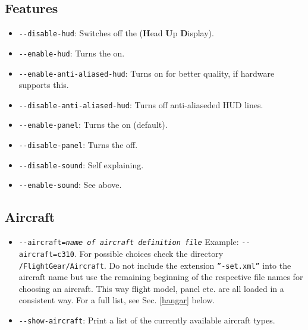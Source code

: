 \subsection{Features}
\begin{itemize}
\item{\texttt{-$ $-disable-hud}}: Switches off the  (\textbf{H}ead \textbf{U}p
  \textbf{D}isplay).
\item{\texttt{-$ $-enable-hud}}: Turns the   on.
\item{\texttt{-$ $-enable-anti-aliased-hud}}: Turns on  for better quality,
if hardware supports this.
\item{\texttt{-$ $-disable-anti-aliased-hud}}: Turns off anti-aliaseded HUD lines.
\item{\texttt{-$ $-enable-panel}}: Turns the  on (default).
\item{\texttt{-$ $-disable-panel}}: Turns the  off.
\item{\texttt{-$ $-disable-sound}}: Self explaining.
\item{\texttt{-$ $-enable-sound}}: See above.
\end{itemize}

\subsection{Aircraft}

\begin{itemize}
\item{\texttt{-$ $-aircraft={\it name of aircraft definition file}}} Example: \texttt{-$ $-aircraft=c310}. For possible choices check the directory \texttt{/FlightGear/Aircraft}. Do not include the extension \texttt{''-set.xml''} into the aircraft name but use the remaining beginning of the respective file names for choosing an aircraft. This way flight model, panel etc. are all loaded in a consistent way. For a full list, see Sec. \ref{hangar} below.
\item{\texttt{-$ $-show-aircraft}}: Print a list of the currently available aircraft types. 
\end{itemize}

